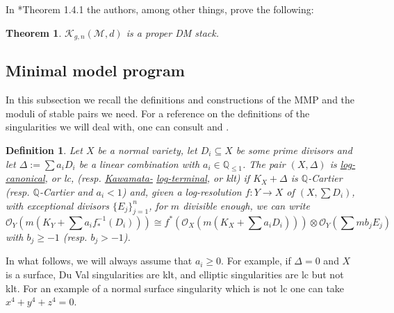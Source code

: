 \documentclass[11pt]{amsart}
\newcommand{\sM}{\mathscr{M}}
\newcommand{\cO}{\mathcal{O}}
\newtheorem{Def}[theorem]{Definition}
\newtheorem{Teo}[theorem]{Theorem}
\theoremstyle{definition}
\begin{document}
In \cite{AV2}*{Theorem 1.4.1} the authors, among other things, prove the following:
\begin{Teo}
 $\mathcal{K}_{g,n}(\sM,d)$ is a proper DM stack. 
\end{Teo}
\subsection{Minimal model program}
In this subsection we recall the definitions and constructions of the MMP and the moduli of stable pairs we need.
For a reference on the definitions of the singularities we will deal with, one can consult \cite{KM} and \cite{Kollarsing}.
\begin{Def}\label{Def:lc:sing}
 Let $X$ be a normal variety, let $D_i \subseteq X$ be some prime divisors and let $\Delta:=\sum a_i D_i $ be a linear combination
 with $a_i \in \mathbb{Q}_{\le 1}$. The pair $(X,\Delta)$ is \underline{log-canonical}, or lc, (resp. \underline{Kawamata-} \underline{log-terminal}, or klt)
 if $K_X+\Delta$ is $\mathbb{Q}$-Cartier (resp. $\mathbb{Q}$-Cartier and $a_i<1$) and,
 given a log-resolution $f:Y \to X$ of $(X,\sum D_i)$, with exceptional divisors $\{E_j\}_{j=1}^n$,
 for $m$ divisible enough, we can write
 $$\cO_Y(m(K_Y+\sum a_i f_*^{-1}(D_i))) \cong f^*(\cO_{X}(m(K_X+\sum a_i D_i)))\otimes \cO_Y(\sum m b_j E_j)$$
 with $b_j \ge -1$ (resp. $b_j >-1$).
\end{Def}
In what follows, we will always assume that $a_i \ge 0$.
For example, if $\Delta =0$ and $X$ is a surface,
Du Val singularities are klt, and elliptic singularities are lc but not klt.
For an example of a normal surface singularity which is not lc one can take $x^4+y^4+z^4=0$.
\end{document}
